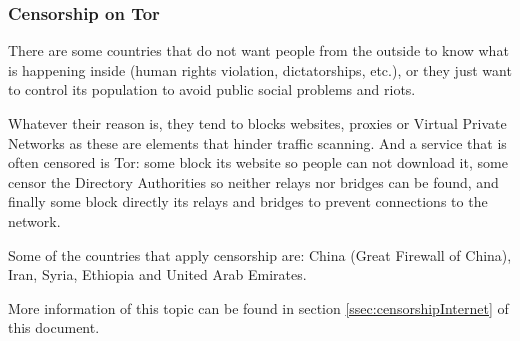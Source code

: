 \subsubsection{Censorship on Tor}
There are some countries that do not want people from the outside to know what is happening inside (human rights violation, dictatorships, etc.), or they just want to control its population to avoid public social problems and riots. 

Whatever their reason is, they tend to blocks websites, proxies or Virtual Private Networks as these are elements that hinder traffic scanning. And a service that is often censored is Tor: some block its website so people can not download it, some censor the Directory Authorities so neither relays nor bridges can be found, and finally some block directly its relays and bridges to prevent connections to the network. 

Some of the countries that apply censorship are: China (Great Firewall of China), Iran, Syria, Ethiopia and United Arab Emirates.

More information of this topic can be found in section \ref{ssec:censorshipInternet} of this document.
